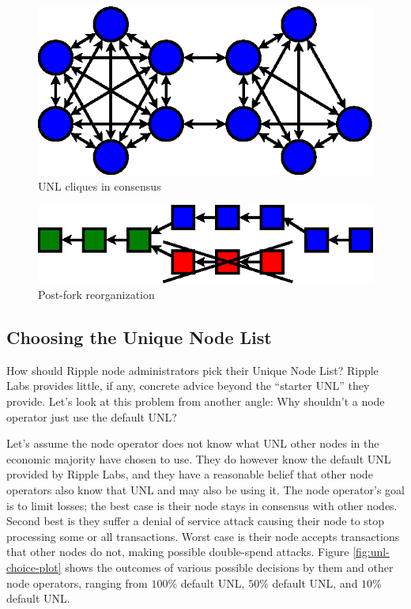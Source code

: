 \documentclass{article}
\begin{document}
\begin{figure}
    \centering
    \includegraphics{figures/unl-clique-consensus.eps}
    \caption{UNL cliques in consensus}
    \label{fig:unl-clique-consensus}
\end{figure}

\begin{figure}
    \centering
    \includegraphics{figures/unl-clique-reorganized-blockchain.eps}
    \caption{Post-fork reorganization}
    \label{fig:unl-clique-post-fork}
\end{figure}

\subsection{Choosing the Unique Node List}

How should Ripple node administrators pick their Unique Node List? Ripple Labs
provides little, if any, concrete advice beyond the ``starter UNL'' they
provide. Let's look at this problem from another angle: Why shouldn't a node
operator just use the default UNL?

Let's assume the node operator does not know what UNL other nodes in the
economic majority have chosen to use. They do however know the default UNL
provided by Ripple Labs, and they have a reasonable belief that other node
operators also know that UNL and may also be using it. The node operator's goal
is to limit losses; the best case is their node stays in consensus with other
nodes. Second best is they suffer a denial of service attack causing their node
to stop processing some or all transactions. Worst case is their node accepts
transactions that other nodes do not, making possible double-spend attacks.
Figure \ref{fig:unl-choice-plot} shows the outcomes of various possible
decisions by them and other node operators, ranging from $100\%$ default UNL,
$50\%$ default UNL, and $10\%$ default UNL.
\end{document}
